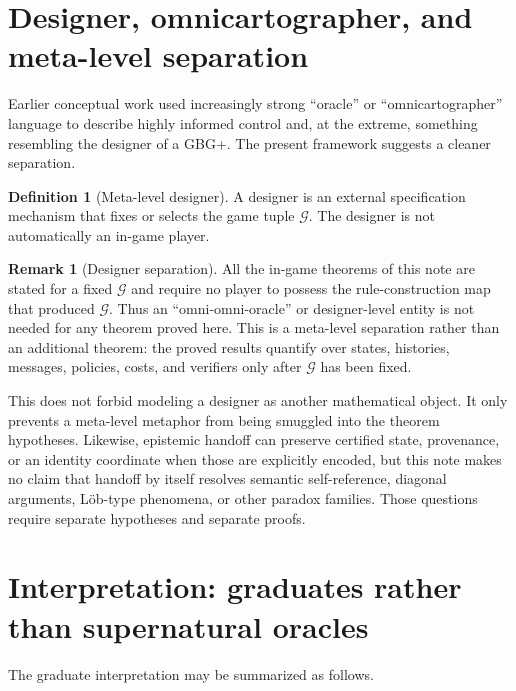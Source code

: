 \documentclass[11pt]{article}
\theoremstyle{definition}
\newtheorem{definition}[theorem]{Definition}
\newtheorem{remark}[theorem]{Remark}
\begin{document}
\section{Designer, omnicartographer, and meta-level separation}

Earlier conceptual work used increasingly strong ``oracle'' or ``omnicartographer'' language to describe highly informed control and, at the extreme, something resembling the designer of a GBG+.  The present framework suggests a cleaner separation.

\begin{definition}[Meta-level designer]
A designer is an external specification mechanism that fixes or selects the game tuple $\mathcal G$.  The designer is not automatically an in-game player.
\end{definition}

\begin{remark}[Designer separation]
All the in-game theorems of this note are stated for a fixed $\mathcal G$ and require no player to possess the rule-construction map that produced $\mathcal G$.  Thus an ``omni-omni-oracle'' or designer-level entity is not needed for any theorem proved here.  This is a meta-level separation rather than an additional theorem: the proved results quantify over states, histories, messages, policies, costs, and verifiers only after $\mathcal G$ has been fixed.
\end{remark}

This does not forbid modeling a designer as another mathematical object.  It only prevents a meta-level metaphor from being smuggled into the theorem hypotheses.  Likewise, epistemic handoff can preserve certified state, provenance, or an identity coordinate when those are explicitly encoded, but this note makes no claim that handoff by itself resolves semantic self-reference, diagonal arguments, L\"ob-type phenomena, or other paradox families.  Those questions require separate hypotheses and separate proofs.

\section{Interpretation: graduates rather than supernatural oracles}

The graduate interpretation may be summarized as follows.
\end{document}
